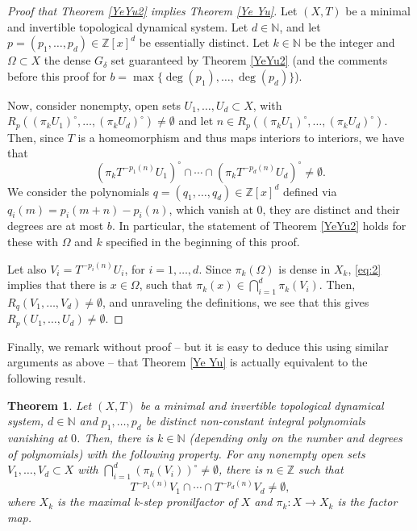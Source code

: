 \documentclass[reqno]{amsart}
\def\Z{{\mathbb Z}}
\def\N{{\mathbb N}}
\newtheorem{theorem}{Theorem}[section]
\theoremstyle{definition}
\theoremstyle{remark}
\def\N{{\mathbb N}}
\begin{document}
\begin{proof}[Proof that Theorem \ref{YeYu2} implies Theorem \ref{Ye Yu}]
Let $(X,T)$ be a minimal and invertible
topological dynamical system. Let $d\in \N$, and let $p=(p_1,\ldots,p_d)\in \Z[x]^d$ be essentially distinct. Let $k\in \N$ be the integer and $\Omega \subset X$ the dense $G_{\delta}$ set guaranteed by Theorem \ref{YeYu2} (and the comments before this proof for $b=\max\{\deg(p_1),\ldots,\deg(p_d)\}$).

Now, consider nonempty, open sets $U_1,\ldots,U_d\subset X$, with 
$R_p((\pi_k U_1)^{\circ},\ldots,(\pi_k U_d)^{\circ}) \neq \emptyset$ 
and let $n\in R_p((\pi_k U_1)^{\circ},\ldots,(\pi_k U_d)^{\circ})$. 
Then, since $T$ is a homeomorphism and thus maps interiors to 
interiors, we have that
\begin{equation}\label{eq:2}
(\pi_kT^{-p_1(n)}U_1)^{\circ} \cap \cdots \cap (\pi_kT^{-p_d(n)}U_d)^{\circ} \neq \emptyset.    
\end{equation}
We consider the polynomials $q=(q_1,\ldots,q_d)\in \Z[x]^d$ defined 
via $q_i(m)=p_i(m+n)-p_i(n)$, which vanish at $0$, they are distinct and their degrees are at most $b$. In particular, the statement of Theorem \ref{YeYu2} holds for these with $\Omega$ and $k$ specified in the beginning of this proof.

Let also $V_i=T^{-p_i(n)}U_i$, for $i=1,\ldots,d$. Since $\pi_k(\Omega)$ is dense in $X_k$, \eqref{eq:2} implies that there is $x\in \Omega$, such that $\pi_k(x)\in \bigcap_{i=1}^d \pi_k(V_i)$. Then, $R_q(V_1,\ldots,V_d) \neq \emptyset$, and unraveling the definitions, we see that this gives $R_p(U_1,\ldots,U_d) \neq \emptyset$.
\end{proof}

Finally, we remark without proof -- but it is easy to deduce this using similar arguments as above -- that Theorem \ref{Ye Yu} is actually equivalent to the following result. 

\begin{theorem}\label{YeYu3}
Let $(X,T)$ be a minimal and invertible topological dynamical system, $d\in \N$ and $p_1,\ldots,p_d$ be distinct non-constant integral polynomials vanishing at $0$. Then, there is $k\in \N$ (depending only on the number and degrees of polynomials) with the following property. For any nonempty open sets $V_1,\ldots,V_d \subset X$ with $\bigcap_{i=1}^d (\pi_k(V_i) )^{\circ} \neq \emptyset$, there is $n\in \Z$ such that
$$T^{-p_1(n)}V_1 \cap \cdots \cap T^{-p_d(n)}V_d \neq \emptyset,$$
where $X_k$ is the maximal k-step 
pronilfactor of $X$ and $\pi_k : X  \to X_k$ is the factor
map.    
\end{theorem}






\vspace{1cm}
\end{document}
